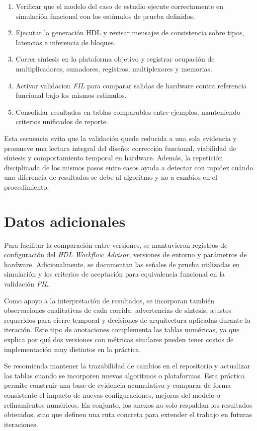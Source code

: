 \begin{enumerate}
    \item Verificar que el modelo del caso de estudio ejecute correctamente en simulación funcional con los estímulos de prueba definidos.
    \item Ejecutar la generación HDL y revisar mensajes de consistencia sobre tipos, latencias e inferencia de bloques.
    \item Correr síntesis en la plataforma objetivo y registrar ocupación de multiplicadores, sumadores, registros, multiplexores y memorias.
    \item Activar validacion \textit{FIL} para comparar salidas de hardware contra referencia funcional bajo los mismos estimulos.
    \item Consolidar resultados en tablas comparables entre ejemplos, manteniendo criterios unificados de reporte.
\end{enumerate}

Esta secuencia evita que la validación quede reducida a una sola evidencia y promueve una lectura integral del diseño: corrección funcional, viabilidad de síntesis y comportamiento temporal en hardware. Además, la repetición disciplinada de los mismos pasos entre casos ayuda a detectar con rapidez cuándo una diferencia de resultados se debe al algoritmo y no a cambios en el procedimiento.

\section{Datos adicionales}
Para facilitar la comparación entre versiones, se mantuvieron registros de configuración del \textit{HDL Workflow Advisor}, versiones de entorno y parámetros de hardware. Adicionalmente, se documentan las señales de prueba utilizadas en simulación y los criterios de aceptación para equivalencia funcional en la validación \textit{FIL}.

Como apoyo a la interpretación de resultados, se incorporan también observaciones cualitativas de cada corrida: advertencias de síntesis, ajustes requeridos para cierre temporal y decisiones de arquitectura aplicadas durante la iteración. Este tipo de anotaciones complementa las tablas numéricas, ya que explica por qué dos versiones con métricas similares pueden tener costos de implementación muy distintos en la práctica.

Se recomienda mantener la trazabilidad de cambios en el repositorio y actualizar las tablas cuando se incorporen nuevos algoritmos o plataformas. Esta práctica permite construir una base de evidencia acumulativa y comparar de forma consistente el impacto de nuevas configuraciones, mejoras del modelo o refinamientos numéricos. En conjunto, los anexos no solo respaldan los resultados obtenidos, sino que definen una ruta concreta para extender el trabajo en futuras iteraciones.
